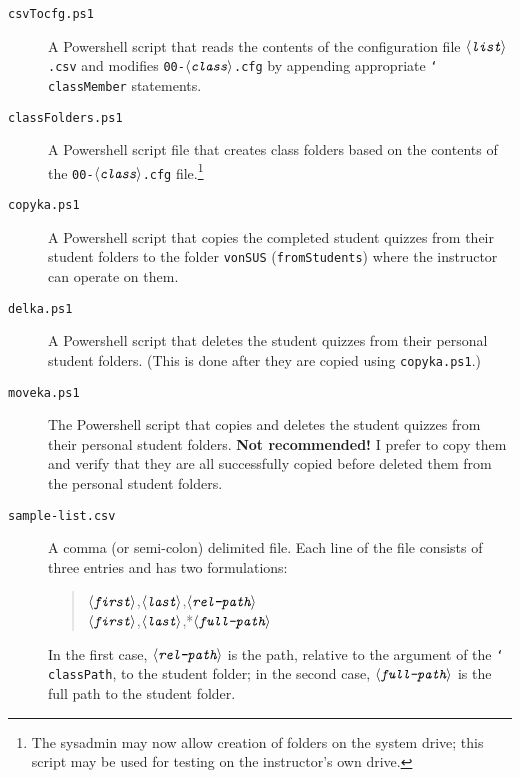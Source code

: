 \documentclass{article}
\def\cs#1{\texttt{\char`\\#1}}
\let\app\textsf
\def\ameta#1{\ensuremath{\langle\textit{\texttt{#1}}\rangle}}
\begin{document}
\begin{description}
\begin{description}
    \item[\normalfont\texttt{csvTocfg.ps1}] A \app{Powershell} script
        that reads the contents of the configuration file \texttt{\ameta{list}.csv} and modifies
        \texttt{00-\ameta{class}.cfg} by appending appropriate \cs{classMember}
        statements.
    \item[\normalfont\texttt{classFolders.ps1}] A \app{Powershell}
        script file that creates class folders based on the
        contents of the \texttt{00-\ameta{class}.cfg}
        file.\footnote{The sysadmin may now allow creation
        of folders on the system drive; this script may be
        used for testing on the instructor's own drive.}
    \item[\normalfont\texttt{copyka.ps1}] A \app{Powershell} script that
        copies the completed student quizzes from their
        student folders to the folder \texttt{vonSUS}
        (\texttt{fromStudents}) where the instructor can
        operate on them.
    \item[\normalfont\texttt{delka.ps1}] A \app{Powershell} script
        that deletes the student quizzes from their personal
        student folders. (This is done after they are copied
        using \texttt{copyka.ps1}.)
    \item[\normalfont\texttt{moveka.ps1}] The \app{Powershell} script
        that copies and deletes the student quizzes from
        their personal student folders. \textbf{Not
        recommended!} I prefer to copy them and verify that
        they are all successfully copied before deleted them
        from the personal student folders.
    \item[\normalfont\texttt{sample-list.csv}] A comma (or semi-colon) delimited file. Each line
    of the file consists of three entries and has two formulations:
    \begin{quote}\ttfamily
      \ameta{first},\ameta{last},\ameta{rel-path}\\[3pt]
      \ameta{first},\ameta{last},*\ameta{full-path}
    \end{quote}
    In the first case, \ameta{rel-path} is the path, relative to the argument of the \cs{classPath},
    to the student folder; in the second case, \ameta{full-path} is the full path to the student
    folder.


\end{description}
\end{description}
\end{document}
